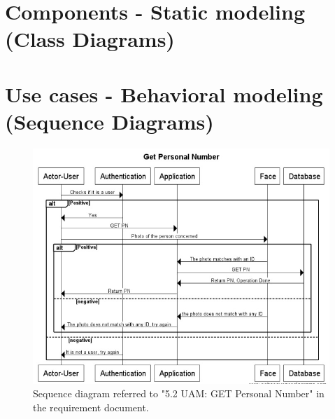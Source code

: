\documentclass[a4paper,11pt]{article}
\begin{document}
\section{Components - Static modeling (Class Diagrams)}


\section{Use cases - Behavioral modeling (Sequence Diagrams)}

\begin{figure}[ht!]
	\centering
	\includegraphics[width=150mm]{SequenceDiagrams/GetPN.jpg}
	\caption{Sequence diagram referred to "5.2 UAM: GET Personal Number" in the requirement document. \label{1}}
\end{figure}
\end{document}
